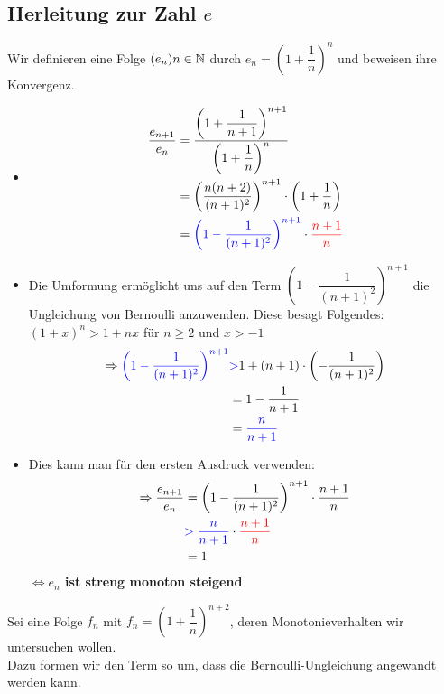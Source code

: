 	\subsection{Herleitung zur Zahl $e$}

Wir definieren eine Folge $(e_{n})n\in\mathbb{N}$ durch $e_{n}=\left(1+\dfrac{1}{n}\right)^n$ und beweisen ihre Konvergenz.

\begin{itemize}

\item\begin{align*}\dfrac{e_{n+1}}{e_{n}}&=\dfrac{{\left(1+\dfrac{1}{n+1}\right)}^{n+1}}{{\left(1+\dfrac{1}{n}\right)}^{n}}\\
&=\left(\dfrac{n(n+2)}{(n+1)^2}\right)^{n+1}\cdot\left(1+\dfrac{1}{n}\right)\\
&=\textcolor{blue}{\left(1-\dfrac{1}{(n+1)^2}\right)^{n+1}}\cdot\textcolor{red}{\dfrac{n+1}{n}}
\end{align*}

\item Die Umformung ermöglicht uns auf den Term $\left(1-\dfrac{1}{(n+1)^2}\right)^{n+1}$ die Ungleichung von Bernoulli anzuwenden. Diese besagt Folgendes: $(1+x)^n>1+nx$ für $n\geq2$ und $x>-1$\\
\begin{align*}\Rightarrow\textcolor{blue}{\left(1-\dfrac{1}{(n+1)^2}\right)^{n+1}}&\textcolor{blue}{>} 1+(n+1)\cdot\left(-\dfrac{1}{(n+1)^2}\right)\\
&=1-\dfrac{1}{n+1}\\
&=\textcolor{blue}{\dfrac{n}{n+1}}
\end{align*}

\item Dies kann man für den ersten Ausdruck verwenden:\\
\begin{align*}
\Rightarrow\dfrac{e_{n+1}}{e_{n}}&=\left(1-\dfrac{1}{(n+1)^2}\right)^{n+1}\cdot\dfrac{n+1}{n}\\
&\textcolor{blue}{>\dfrac{n}{n+1}}\cdot\textcolor{red}{\dfrac{n+1}{n}}\\
&=1
\end{align*}
\textbf{$\Leftrightarrow e_{n}$ ist streng monoton steigend}
\end{itemize}

Sei eine Folge $f_{n}$ mit $f_{n}=\left(1+\dfrac{1}{n}\right)^{n+2}$, deren Monotonieverhalten wir untersuchen wollen.\\
Dazu formen wir den Term so um, dass die Bernoulli-Ungleichung angewandt werden kann.

